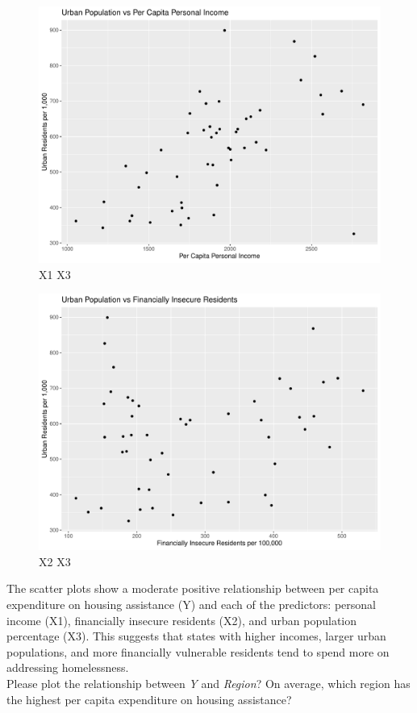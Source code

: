 \documentclass[12pt,letterpaper]{article}
\begin{document}
\begin{itemize}
\begin{figure}[h!]\centering
	\caption{\footnotesize X1 X3}
	\label{fig:8}
	\includegraphics[width=.75\textwidth]{X1_X3.pdf}
\end{figure}

\begin{figure}[h!]\centering
	\caption{\footnotesize X2 X3}
	\label{fig:9}
	\includegraphics[width=.75\textwidth]{X2_X3.pdf}
\end{figure}

The scatter plots show a moderate positive relationship between per capita expenditure on housing assistance (Y) and each of the predictors: personal income (X1), financially insecure residents (X2), and urban population percentage (X3). This suggests that states with higher incomes, larger urban populations, and more financially vulnerable residents tend to spend more on addressing homelessness.\\

Please plot the relationship between \emph{Y} and \emph{Region}? On average, which region has the highest per capita expenditure on housing assistance?
\vspace{.2cm}
 


\end{itemize}
\end{document}
